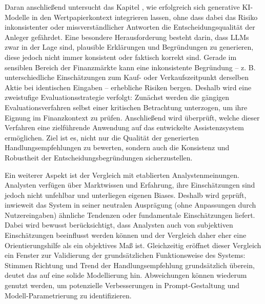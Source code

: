 
Daran anschließend untersucht das Kapitel \textbf{}, wie erfolgreich sich generative \acs{KI}-Modelle in den Wertpapierkontext integrieren lassen, ohne dass dabei das Risiko inkonsistenter oder missverständlicher Antworten die Entscheidungsqualität der Anleger gefährdet.
Eine besondere Herausforderung besteht darin, dass \acs{LLM}s zwar in der Lage sind, plausible Erklärungen und Begründungen zu generieren, diese jedoch nicht immer konsistent oder faktisch korrekt sind.
Gerade im sensiblen Bereich der Finanzmärkte kann eine inkonsistente Begründung -- z. B. unterschiedliche Einschätzungen zum Kauf- oder Verkaufszeitpunkt derselben Aktie bei identischen Eingaben -- erhebliche Risiken bergen.
Deshalb wird eine zweistufige Evaluationsstrategie verfolgt:
Zunächst werden die gängigen Evaluationsverfahren selbst einer kritischen Betrachtung unterzogen, um ihre Eignung im Finanzkontext zu prüfen.
Anschließend wird überprüft, welche dieser Verfahren eine zielführende Anwendung auf das entwickelte Assistenzsystem ermöglichen.
Ziel ist es, nicht nur die Qualität der generierten Handlungsempfehlungen zu bewerten, sondern auch die Konsistenz und Robustheit der Entscheidungsbegründungen sicherzustellen.

Ein weiterer Aspekt ist der Vergleich mit etablierten Analystenmeinungen.
Analysten verfügen über Marktwissen und Erfahrung, ihre Einschätzungen sind jedoch nicht unfehlbar und unterliegen eigenen Biases.
Deshalb wird geprüft, inwieweit das System in seiner neutralen Ausprägung (ohne Anpassungen durch Nutzereingaben) ähnliche Tendenzen oder fundamentale Einschätzungen liefert.
Dabei wird bewusst berücksichtigt, dass Analysten auch von subjektiven Einschätzungen beeinflusst werden können und der Vergleich daher eher eine Orientierungshilfe als ein objektives Maß ist.
Gleichzeitig eröffnet dieser Vergleich ein Fenster zur Validierung der grundsätzlichen Funktionsweise des Systems:
Stimmen Richtung und Trend der Handlungsempfehlung grundsätzlich überein, deutet das auf eine solide Modellierung hin.
Abweichungen können wiederum genutzt werden, um potenzielle Verbesserungen in Prompt-Gestaltung und Modell-Parametrierung zu identifizieren.


